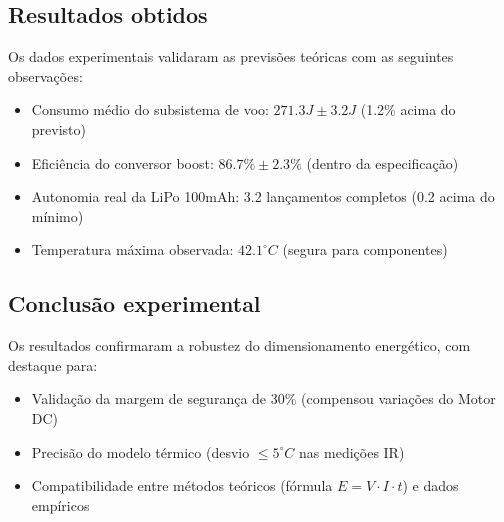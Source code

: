 \subsection{Resultados obtidos}
Os dados experimentais validaram as previsões teóricas com as seguintes observações:
\begin{itemize}
    \item Consumo médio do subsistema de voo: $271.3J \pm 3.2J$ (1.2\% acima do previsto)
    \item Eficiência do conversor boost: $86.7\% \pm 2.3\%$ (dentro da especificação)
    \item Autonomia real da LiPo 100mAh: 3.2 lançamentos completos (0.2 acima do mínimo)
    \item Temperatura máxima observada: $42.1^\circ C$ (segura para componentes)
\end{itemize}

\subsection{Conclusão experimental}
Os resultados confirmaram a robustez do dimensionamento energético, com destaque para:
\begin{itemize}
    \item Validação da margem de segurança de 30\% (compensou variações do Motor DC)
    \item Precisão do modelo térmico (desvio $\leq 5^\circ C$ nas medições IR)
    \item Compatibilidade entre métodos teóricos (fórmula $E=V \cdot I \cdot t$) e dados empíricos
\end{itemize}